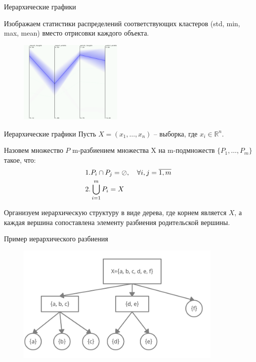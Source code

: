 \documentclass[fleqn, xcolor=x11names]{beamer}
\begin{document}
\begin{frame}{Иерархические графики}

    Изображаем статистики распределений соответствующих кластеров (std, min, max, mean)
    вместо отрисовки каждого объекта.

    \begin{figure}[htb]
        \centering
        \includegraphics[width=5cm]{hierarchical_1.png}
    \end{figure}
\end{frame}

\begin{frame}{Иерархические графики}
    Пусть $X=(x_1,\ldots,x_n)$ -- выборка, где $x_i\in \mathbb{R}^n$. 

    \vspace{10px}

    Назовем множество $P$ m-разбиением множества X на m-подмножеств $\{P_1,\ldots,P_m\}$
    такое, что:
    \begin{align}
        \notag &1. P_i \cap  P_j = \oslash, \hspace{10px} \forall i,j =\overline{1,m} \\
        \notag &2. \bigcup\limits_{i=1}^{m} P_i = X 
    \end{align}

    Организуем иерархическую структуру в виде дерева, где корнем является $X$, 
    а каждая вершина сопоставлена элементу разбиения родительской вершины.
\end{frame}

\begin{frame}{Пример иерархического разбиения}
    \begin{figure}[htb]
        \centering
        \includegraphics[width=10cm]{hierarchical_graph.png}
    \end{figure}

\end{frame}
\end{document}
